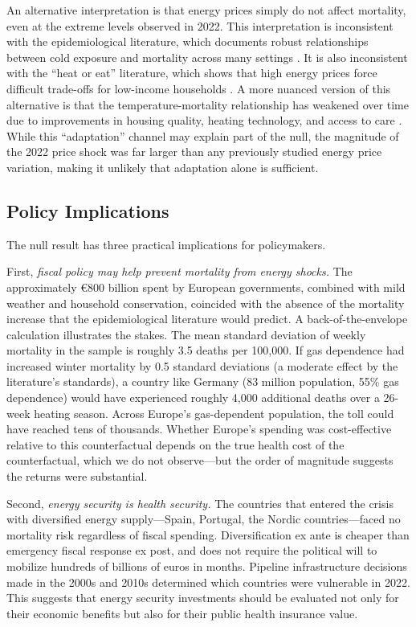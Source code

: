 \documentclass[12pt]{article}
\begin{document}
An alternative interpretation is that energy prices simply do not affect mortality, even at the extreme levels observed in 2022. This interpretation is inconsistent with the epidemiological literature, which documents robust relationships between cold exposure and mortality across many settings \citep{gasparrini2015, wilkinson2001}. It is also inconsistent with the ``heat or eat'' literature, which shows that high energy prices force difficult trade-offs for low-income households \citep{beatty2014}. A more nuanced version of this alternative is that the temperature-mortality relationship has weakened over time due to improvements in housing quality, heating technology, and access to care \citep{barreca2016, heutel2021}. While this ``adaptation'' channel may explain part of the null, the magnitude of the 2022 price shock was far larger than any previously studied energy price variation, making it unlikely that adaptation alone is sufficient.

\subsection{Policy Implications}

The null result has three practical implications for policymakers.

First, \textit{fiscal policy may help prevent mortality from energy shocks.} The approximately \euro 800 billion spent by European governments, combined with mild weather and household conservation, coincided with the absence of the mortality increase that the epidemiological literature would predict. A back-of-the-envelope calculation illustrates the stakes. The mean standard deviation of weekly mortality in the sample is roughly 3.5 deaths per 100,000. If gas dependence had increased winter mortality by 0.5 standard deviations (a moderate effect by the literature's standards), a country like Germany (83 million population, 55\% gas dependence) would have experienced roughly 4,000 additional deaths over a 26-week heating season. Across Europe's gas-dependent population, the toll could have reached tens of thousands. Whether Europe's spending was cost-effective relative to this counterfactual depends on the true health cost of the counterfactual, which we do not observe---but the order of magnitude suggests the returns were substantial.

Second, \textit{energy security is health security.} The countries that entered the crisis with diversified energy supply---Spain, Portugal, the Nordic countries---faced no mortality risk regardless of fiscal spending. Diversification ex ante is cheaper than emergency fiscal response ex post, and does not require the political will to mobilize hundreds of billions of euros in months. Pipeline infrastructure decisions made in the 2000s and 2010s determined which countries were vulnerable in 2022. This suggests that energy security investments should be evaluated not only for their economic benefits but also for their public health insurance value.
\end{document}
